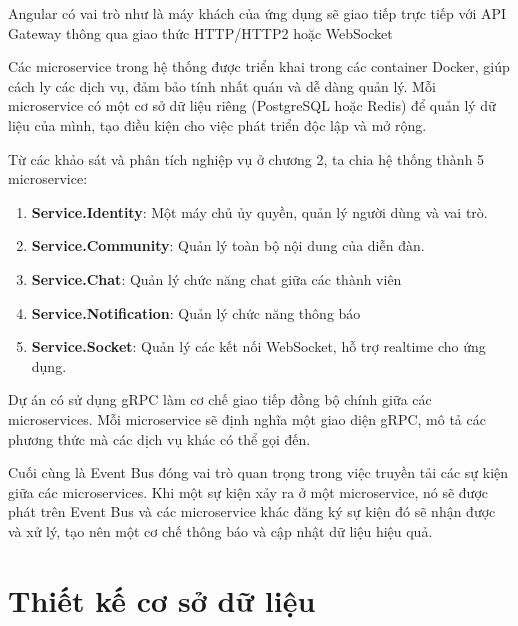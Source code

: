\documentclass[../index.tex]{subfiles}
\begin{document}
    Angular có vai trò như là máy khách của ứng dụng sẽ giao tiếp trực tiếp với
    API Gateway thông qua giao thức HTTP/HTTP2 hoặc WebSocket

    Các microservice trong hệ thống được triển khai trong các container Docker,
    giúp cách ly các dịch vụ, đảm bảo tính nhất quán và dễ dàng quản lý. Mỗi
    microservice có một cơ sở dữ liệu riêng (PostgreSQL hoặc Redis) để quản lý
    dữ liệu của mình, tạo điều kiện cho việc phát triển độc lập và mở rộng.

    Từ các khảo sát và phân tích nghiệp vụ ở chương 2, ta chia hệ thống thành 5
    microservice:
    \begin{enumerate}
        \item \textbf{Service.Identity}: Một máy chủ ủy quyền, quản lý người
            dùng và vai trò.

        \item \textbf{Service.Community}: Quản lý toàn bộ nội dung của diễn đàn.

        \item \textbf{Service.Chat}: Quản lý chức năng chat giữa các thành viên

        \item \textbf{Service.Notification}: Quản lý chức năng thông báo

        \item \textbf{Service.Socket}: Quản lý các kết nối WebSocket, hỗ trợ
            realtime cho ứng dụng.
    \end{enumerate}

    Dự án có sử dụng gRPC làm cơ chế giao tiếp đồng bộ chính giữa các
    microservices. Mỗi microservice sẽ định nghĩa một giao diện gRPC, mô tả các
    phương thức mà các dịch vụ khác có thể gọi đến.

    Cuối cùng là Event Bus đóng vai trò quan trọng trong việc truyền tải các sự
    kiện giữa các microservices. Khi một sự kiện xảy ra ở một microservice, nó
    sẽ được phát trên Event Bus và các microservice khác đăng ký sự kiện đó sẽ
    nhận được và xử lý, tạo nên một cơ chế thông báo và cập nhật dữ liệu hiệu quả.

    \section{Thiết kế cơ sở dữ liệu}
\end{document}
